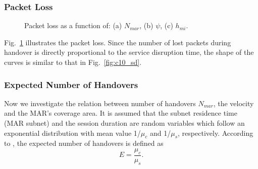 \subsubsection{Packet Loss}
\begin{figure}[h!]
\centering
{}
\caption[Packet Loss.]{Packet loss as a function of: (a) $N_{mar}$, (b) $\psi$, (c) $h_{mi}$.}
\label{fig:c10_pl}
\end{figure}
Fig.~\ref{fig:c10_pl} illustrates the packet loss. Since the number of lost packets during handover is directly proportional to the service disruption time, the shape of the curves is similar to that in Fig.~\ref{fig:c10_sd}. 

\subsubsection{Expected Number of Handovers}
Now we investigate the relation between number of handovers $N_{mar}$, the velocity and the MAR's coverage area. It is assumed that the subnet residence time (MAR subnet) and the session duration are random variables which follow an exponential distribution with mean value 1/$\mu_{c}$ and 1/$\mu_{s}$, respectively. According to \cite{HO_comparison_Makaya}, the expected number of handovers is defined as \\
\begin{equation}
  E=\frac{\mu_{c}}{\mu_{s}}.
\end{equation}

